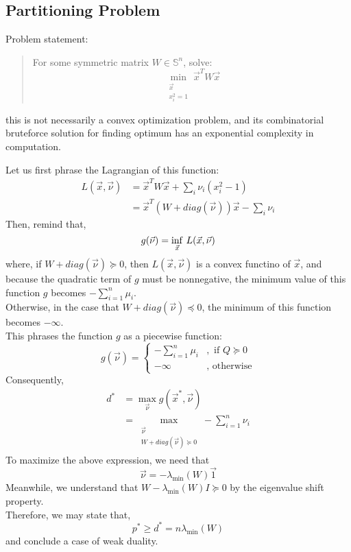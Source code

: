 \subsection{Partitioning Problem}
Problem statement:
\begin{quote}
    For some symmetric matrix $W \in \mathbb{S}^n$, solve:
    \[
        \min_{\substack{\vec{x} \\ x_i^2 = 1}} \vec{x}^T W \vec{x}
    \]
\end{quote}
this is not necessarily a convex optimization problem, and its combinatorial bruteforce solution for finding optimum has an exponential complexity in computation.

Let us first phrase the Lagrangian of this function:
\begin{align*}
    L(\vec{x}, \vec{\nu})
    &= \vec{x}^T W \vec{x} + \sum_i \nu_i (x_i^2 - 1) \\
    &= \vec{x}^T (W + diag(\vec{\nu})) \vec{x} - \sum_i \nu_i
\end{align*}
Then, remind that,
\[
    g(\vec{\nu}) = \underset{\vec{x}}{\rm inf}\ L(\vec{x}, \vec{\nu})
\]
where, if $W + diag(\vec{\nu}) \succcurlyeq 0$, then $L(\vec{x}, \vec{\nu})$ is a convex functino of $\vec{x}$, and because the quadratic term of $g$ must be nonnegative, the minimum value of this function $g$ becomes $-\sum_{i = 1}^n \mu_i$. \\
Otherwise, in the case that $W + diag(\vec{\nu}) \preccurlyeq 0$, the minimum of this function becomes $-\infty$. \\
This phrases the function $g$ as a piecewise function:
\[
    g(\vec{\nu}) = 
    \begin{cases}
        -\sum_{i = 1}^n \mu_i &,\text{ if } Q \succcurlyeq 0 \\
        -\infty &,\text{ otherwise}
    \end{cases}
\]
Consequently,
\begin{align*}
    d^*
    &= \max_{\vec{\nu}} g(\vec{x}^*, \vec{\nu}) \\
    &= \max_{\substack{\vec{\nu} \\ W + diag(\vec{\nu}) \succcurlyeq 0}} - \sum_{i = 1}^n \nu_i
\end{align*}
To maximize the above expression, we need that
\[
    \vec{\nu} = - \lambda_{\min} (W) \vec{1}
\]
Meanwhile, we understand that $W - \lambda_{\min} (W) I \succcurlyeq 0$ by the eigenvalue shift property. \\
Therefore, we may state that,
\[
    p^* \geq d^* = n \lambda_{\min} (W)
\]
and conclude a case of weak duality.


